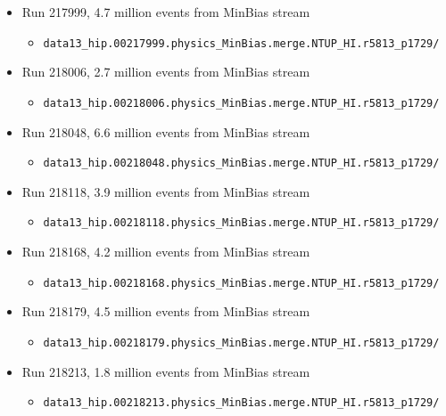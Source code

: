\begin{itemize}

\item Run 217999, 4.7 million events from MinBias stream
\begin{itemize}[leftmargin=*]
\item[] \verb|data13_hip.00217999.physics_MinBias.merge.NTUP_HI.r5813_p1729/|
\end{itemize}

\item Run 218006, 2.7 million events from MinBias stream
\begin{itemize}[leftmargin=*]
\item[] \verb|data13_hip.00218006.physics_MinBias.merge.NTUP_HI.r5813_p1729/|
\end{itemize}

\item Run 218048, 6.6 million events from MinBias stream
\begin{itemize}[leftmargin=*]
\item[] \verb|data13_hip.00218048.physics_MinBias.merge.NTUP_HI.r5813_p1729/|
\end{itemize}

\item Run 218118, 3.9 million events from MinBias stream
\begin{itemize}[leftmargin=*]
\item[] \verb|data13_hip.00218118.physics_MinBias.merge.NTUP_HI.r5813_p1729/|
\end{itemize}

\item Run 218168, 4.2 million events from MinBias stream
\begin{itemize}[leftmargin=*]
\item[] \verb|data13_hip.00218168.physics_MinBias.merge.NTUP_HI.r5813_p1729/|
\end{itemize}

\item Run 218179, 4.5 million events from MinBias stream
\begin{itemize}[leftmargin=*]
\item[] \verb|data13_hip.00218179.physics_MinBias.merge.NTUP_HI.r5813_p1729/|
\end{itemize}

\item Run 218213, 1.8 million events from MinBias stream
\begin{itemize}[leftmargin=*]
\item[] \verb|data13_hip.00218213.physics_MinBias.merge.NTUP_HI.r5813_p1729/|
\end{itemize}


\end{itemize}
